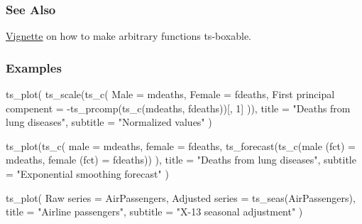 \documentclass[
  letterpaper,
  DIV=11,
  numbers=noendperiod]{scrreport}
\newenvironment{Shaded}{\begin{snugshade}}{\end{snugshade}}
\newcommand{\AttributeTok}[1]{\textcolor[rgb]{0.40,0.45,0.13}{#1}}
\newcommand{\DecValTok}[1]{\textcolor[rgb]{0.68,0.00,0.00}{#1}}
\newcommand{\FunctionTok}[1]{\textcolor[rgb]{0.28,0.35,0.67}{#1}}
\newcommand{\NormalTok}[1]{\textcolor[rgb]{0.00,0.23,0.31}{#1}}
\newcommand{\OtherTok}[1]{\textcolor[rgb]{0.00,0.23,0.31}{#1}}
\newcommand{\SpecialCharTok}[1]{\textcolor[rgb]{0.37,0.37,0.37}{#1}}
\newcommand{\StringTok}[1]{\textcolor[rgb]{0.13,0.47,0.30}{#1}}
\begin{document}
\subsubsection{See Also}\label{see-also-6}

\href{https://docs.ropensci.org/tsbox/articles/ts-functions.html}{Vignette}
on how to make arbitrary functions ts-boxable.

\subsubsection{Examples}\label{examples-82}

\begin{Shaded}
\begin{Highlighting}[]
\FunctionTok{ts\_plot}\NormalTok{(}
  \FunctionTok{ts\_scale}\NormalTok{(}\FunctionTok{ts\_c}\NormalTok{(}
    \AttributeTok{Male =}\NormalTok{ mdeaths,}
    \AttributeTok{Female =}\NormalTok{ fdeaths,}
    \StringTok{\textasciigrave{}}\AttributeTok{First principal compenent}\StringTok{\textasciigrave{}} \OtherTok{=} \SpecialCharTok{{-}}\FunctionTok{ts\_prcomp}\NormalTok{(}\FunctionTok{ts\_c}\NormalTok{(mdeaths, fdeaths))[, }\DecValTok{1}\NormalTok{]}
\NormalTok{  )),}
  \AttributeTok{title =} \StringTok{"Deaths from lung diseases"}\NormalTok{,}
  \AttributeTok{subtitle =} \StringTok{"Normalized values"}
\NormalTok{)}

\FunctionTok{ts\_plot}\NormalTok{(}\FunctionTok{ts\_c}\NormalTok{(}
  \AttributeTok{male =}\NormalTok{ mdeaths, }\AttributeTok{female =}\NormalTok{ fdeaths,}
  \FunctionTok{ts\_forecast}\NormalTok{(}\FunctionTok{ts\_c}\NormalTok{(}\StringTok{\textasciigrave{}}\AttributeTok{male (fct)}\StringTok{\textasciigrave{}} \OtherTok{=}\NormalTok{ mdeaths, }\StringTok{\textasciigrave{}}\AttributeTok{female (fct)}\StringTok{\textasciigrave{}} \OtherTok{=}\NormalTok{ fdeaths))}
\NormalTok{),}
\AttributeTok{title =} \StringTok{"Deaths from lung diseases"}\NormalTok{,}
\AttributeTok{subtitle =} \StringTok{"Exponential smoothing forecast"}
\NormalTok{)}

\FunctionTok{ts\_plot}\NormalTok{(}
  \StringTok{\textasciigrave{}}\AttributeTok{Raw series}\StringTok{\textasciigrave{}} \OtherTok{=}\NormalTok{ AirPassengers,}
  \StringTok{\textasciigrave{}}\AttributeTok{Adjusted series}\StringTok{\textasciigrave{}} \OtherTok{=} \FunctionTok{ts\_seas}\NormalTok{(AirPassengers),}
  \AttributeTok{title =} \StringTok{"Airline passengers"}\NormalTok{,}
  \AttributeTok{subtitle =} \StringTok{"X{-}13 seasonal adjustment"}
\NormalTok{)}



\end{Highlighting}
\end{Shaded}
\end{document}
